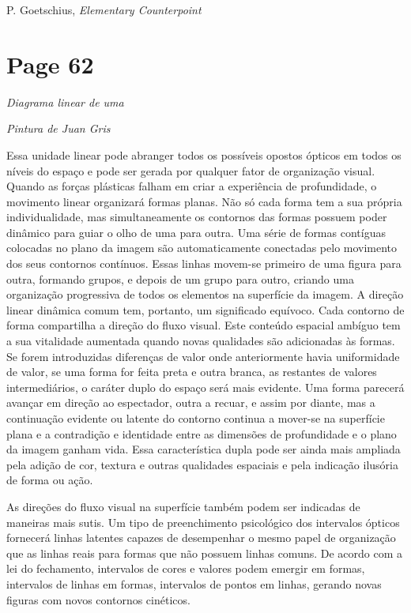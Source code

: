 \documentclass[a4paper]{article}
\begin{document}
\textbullet{} P. Goetschius, \textit{Elementary Counterpoint}


\newpage
\section*{Page 62}

\textit{Diagrama linear de uma}

\textit{Pintura de Juan Gris}

Essa unidade linear pode abranger todos os possíveis opostos ópticos em todos os níveis do espaço e pode ser gerada por qualquer fator de organização visual. Quando as forças plásticas falham em criar a experiência de profundidade, o movimento linear organizará formas planas. Não só cada forma tem a sua própria individualidade, mas simultaneamente os contornos das formas possuem poder dinâmico para guiar o olho de uma para outra. Uma série de formas contíguas colocadas no plano da imagem são automaticamente conectadas pelo movimento dos seus contornos contínuos. Essas linhas movem-se primeiro de uma figura para outra, formando grupos, e depois de um grupo para outro, criando uma organização progressiva de todos os elementos na superfície da imagem. A direção linear dinâmica comum tem, portanto, um significado equívoco. Cada contorno de forma compartilha a direção do fluxo visual. Este conteúdo espacial ambíguo tem a sua vitalidade aumentada quando novas qualidades são adicionadas às formas. Se forem introduzidas diferenças de valor onde anteriormente havia uniformidade de valor, se uma forma for feita preta e outra branca, as restantes de valores intermediários, o caráter duplo do espaço será mais evidente. Uma forma parecerá avançar em direção ao espectador, outra a recuar, e assim por diante, mas a continuação evidente ou latente do contorno continua a mover-se na superfície plana e a contradição e identidade entre as dimensões de profundidade e o plano da imagem ganham vida. Essa característica dupla pode ser ainda mais ampliada pela adição de cor, textura e outras qualidades espaciais e pela indicação ilusória de forma ou ação.

As direções do fluxo visual na superfície também podem ser indicadas de maneiras mais sutis. Um tipo de preenchimento psicológico dos intervalos ópticos fornecerá linhas latentes capazes de desempenhar o mesmo papel de organização que as linhas reais para formas que não possuem linhas comuns. De acordo com a lei do fechamento, intervalos de cores e valores podem emergir em formas, intervalos de linhas em formas, intervalos de pontos em linhas, gerando novas figuras com novos contornos cinéticos.
\end{document}
